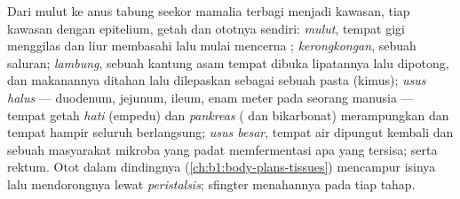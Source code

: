 \begin{proposition}\label{prop:b1:digestion-absorption:tract}
Dari mulut ke anus tabung seekor mamalia terbagi menjadi kawasan, tiap
kawasan dengan epitelium, getah dan ototnya sendiri: \emph{mulut},
tempat gigi menggilas dan liur membasahi lalu mulai mencerna ;
\emph{kerongkongan}, sebuah saluran; \emph{lambung}, sebuah kantung
asam tempat  dibuka lipatannya lalu dipotong, dan makanannya
ditahan lalu dilepaskan sebagai sebuah pasta (kimus); \emph{usus
halus} --- duodenum, jejunum, ileum, enam meter pada seorang manusia
--- tempat getah \emph{hati} (empedu) dan \emph{pankreas} ( dan
bikarbonat) merampungkan  dan tempat hampir seluruh
 berlangsung; \emph{usus besar}, tempat air dipungut
kembali dan sebuah masyarakat mikroba yang padat memfermentasi apa
yang tersisa; serta rektum. Otot dalam dindingnya
(\cref{ch:b1:body-plans-tissues}) mencampur isinya lalu mendorongnya
lewat \emph{peristalsis}; sfingter menahannya pada tiap tahap.
\end{proposition}

